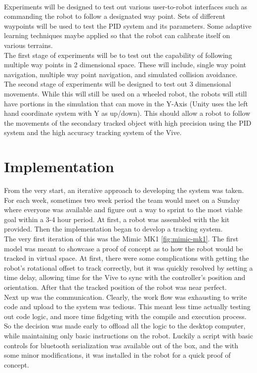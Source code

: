 \documentclass[10pt,a4paper]{article}
\begin{document}
	\\ 
	Experiments will be designed to test out various user-to-robot interfaces such as commanding the robot to follow a designated way point. Sets of different waypoints will be used to test the PID system and its parameters. Some adaptive learning techniques maybe applied so that the robot can calibrate itself on various terrains.
	\\ 
	The first stage of experiments will be to test out the capability of following multiple way points in 2 dimensional space. These will include, single way point navigation, multiple way point navigation, and simulated collision avoidance.
	\\ 

	
	The second stage of experiments will be designed to test out 3 dimensional movements. While this will still be used on a wheeled robot, the robots will still have portions in the simulation that can move in the Y-Axis (Unity uses the left hand coordinate system with Y as up/down). This should allow a robot to follow the movements of the secondary tracked object with high precision using the PID system and the high accuracy tracking system of the Vive.
	
	\section{Implementation}
	From the very start, an iterative approach to developing the system was taken. For each week, sometimes two week period the team would meet on a Sunday where everyone was available and figure out a way to sprint to the most viable goal within a 3-4 hour period. At first, a robot was assembled with the kit provided. Then the implementation began to develop a tracking system.
	\\
	The very first iteration of this was the Mimic MK1 \ref{fig:mimic-mk1}. The first model was meant to showcase a proof of concept as to how the robot would be tracked in virtual space. At first, there were some complications with getting the robot's rotational offset to track correctly, but it was quickly resolved by setting a time delay, allowing time for the Vive to sync with the controller's position and orientation. After that the tracked position of the robot was near perfect.
	\\
	Next up was the communication. Clearly, the work flow was exhausting to write code and upload to the system was tedious. This meant less time actually testing out code logic, and more time fidgeting with the compile and execution process. So the decision was made early to offload all the logic to the desktop computer, while maintaining only basic instructions on the robot. Luckily a script with basic controls for bluetooth serialization was available out of the box, and the with some minor modifications, it was installed in the robot for a quick proof of concept.
		
\end{document}
